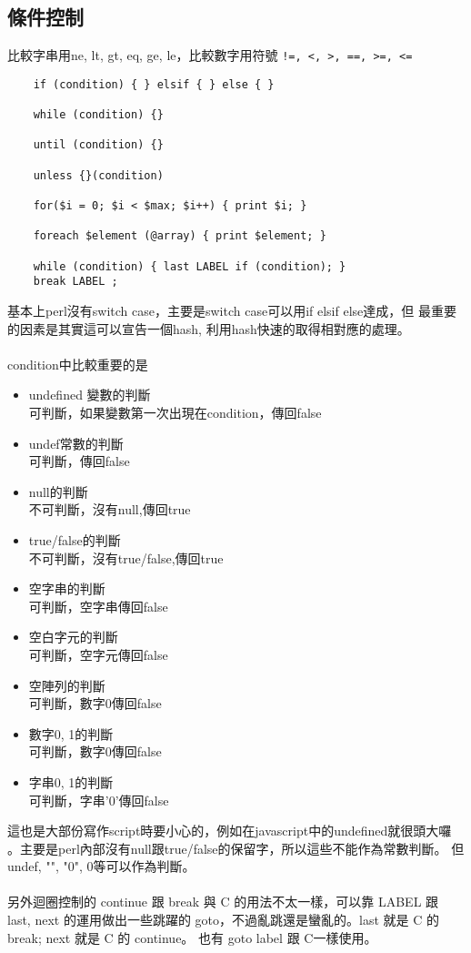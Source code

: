    \subsection{條件控制}
    比較字串用ne, lt, gt, eq, ge, le，比較數字用符號 \verb.!=, <, >, ==, >=, <=.
    \begin{verbatim}
    if (condition) { } elsif { } else { }

    while (condition) {}

    until (condition) {}

    unless {}(condition)

    for($i = 0; $i < $max; $i++) { print $i; }

    foreach $element (@array) { print $element; }

    while (condition) { last LABEL if (condition); }
    break LABEL ;
    \end{verbatim}
    基本上perl沒有switch case，主要是switch case可以用if elsif else達成，但
    最重要的因素是其實這可以宣告一個hash, 利用hash快速的取得相對應的處理。
    \\\\
    condition中比較重要的是
    \begin{itemize}
    \item undefined 變數的判斷 \hfill \\
    	可判斷，如果變數第一次出現在condition，傳回false
    \item undef常數的判斷 \hfill \\
    	可判斷，傳回false
    \item null的判斷 \hfill \\
    	不可判斷，沒有null,傳回true
    \item true/false的判斷 \hfill \\
    	不可判斷，沒有true/false,傳回true
    \item 空字串的判斷 \hfill \\ 
	可判斷，空字串傳回false
    \item 空白字元的判斷 \hfill \\
	可判斷，空字元傳回false
    \item 空陣列的判斷 \hfill \\
	可判斷，數字0傳回false
    \item 數字0, 1的判斷 \hfill \\
	可判斷，數字0傳回false
    \item 字串0, 1的判斷 \hfill \\
	可判斷，字串'0'傳回false
    \end{itemize}
    這也是大部份寫作script時要小心的，例如在javascript中的undefined就很頭大囉
    。主要是perl內部沒有null跟true/false的保留字，所以這些不能作為常數判斷。
    但undef, "", "0", 0等可以作為判斷。
    \\\\ 
    另外迴圈控制的 continue 跟 break 與 C 的用法不太一樣，可以靠 LABEL 跟 last, next
    的運用做出一些跳躍的 goto，不過亂跳還是蠻亂的。last 就是 C 的 break; next
    就是 C 的 continue。 也有 goto label 跟 C一樣使用。
